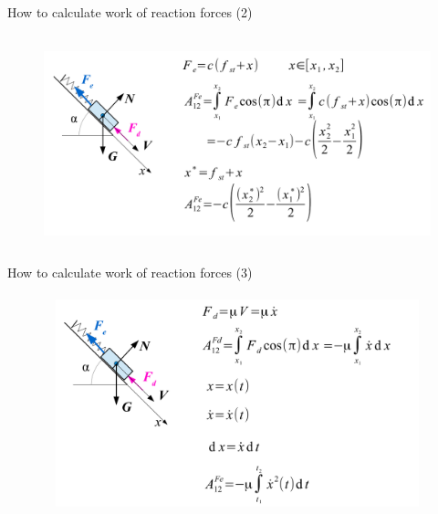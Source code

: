 \documentclass[aspectratio=169]{beamer}
\begin{document}
    \begin{frame}[t]{How to calculate work of reaction forces (2)}
    \framesubtitle{}
        \begin{figure}[H]
            \centering\includegraphics[height=6cm,width=1\textwidth,keepaspectratio]{image12.png}
            \label{fig:image12}
        \end{figure}
    \end{frame}
    
    \begin{frame}[t]{How to calculate work of reaction forces (3)}
    \framesubtitle{}
        \begin{figure}[H]
            \centering\includegraphics[height=6cm,width=1\textwidth,keepaspectratio]{image14.png}
            \label{fig:image14}
        \end{figure}
    \end{frame}
    
\end{document}
